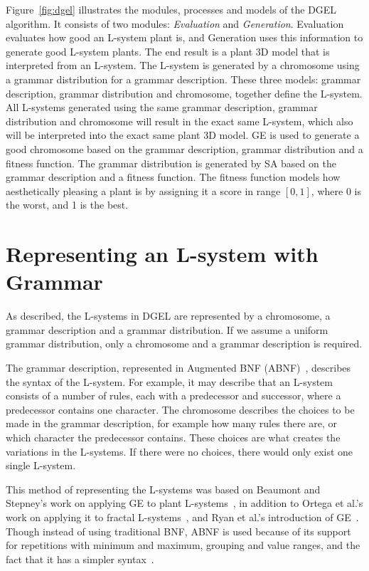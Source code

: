 Figure~\ref{fig:dgel} illustrates the modules, processes and models of the \gls{DGEL} algorithm.
It consists of two modules: \textit{Evaluation} and \textit{Generation}.
Evaluation evaluates how good an \gls{L-system} plant is, and Generation uses this information to generate good \gls{L-system} plants.
The end result is a plant 3D model that is interpreted from an \gls{L-system}.
The \gls{L-system} is generated by a chromosome using a grammar distribution for a grammar description.
These three models: grammar description, grammar distribution and chromosome, together define the \gls{L-system}.
All \glspl{L-system} generated using the same grammar description, grammar distribution and chromosome will result in the exact same \gls{L-system}, which also will be interpreted into the exact same plant 3D model.
\gls{GE} is used to generate a good chromosome based on the grammar description, grammar distribution and a fitness function.
The grammar distribution is generated by \gls{SA} based on the grammar description and a fitness function.
The fitness function models how aesthetically pleasing a plant is by assigning it a score in range $[0, 1]$, where 0 is the worst, and 1 is the best.

\section{Representing an L-system with Grammar}
\label{sec:grammar}
As described, the \glspl{L-system} in \gls{DGEL} are represented by a chromosome, a grammar description and a grammar distribution.
If we assume a uniform grammar distribution, only a chromosome and a grammar description is required.

The grammar description, represented in Augmented BNF (ABNF)~\cite{RFC5234}, describes the syntax of the \gls{L-system}.
For example, it may describe that an \gls{L-system} consists of a number of rules, each with a predecessor and successor, where a predecessor contains one character.
The chromosome describes the choices to be made in the grammar description, for example how many rules there are, or which character the predecessor contains.
These choices are what creates the variations in the \glspl{L-system}.
If there were no choices, there would only exist one single \gls{L-system}.

This method of representing the \glspl{L-system} was based on Beaumont and Stepney's work on applying \gls{GE} to plant \glspl{L-system}~\cite{2009Beaumont}, in addition to Ortega et al.'s work on applying it to fractal \glspl{L-system}~\cite{2003Ortega}, and Ryan et al.'s introduction of \gls{GE}~\cite{1998Ryan}.
Though instead of using traditional BNF, ABNF is used because of its support for repetitions with minimum and maximum, grouping and value ranges, and the fact that it has a simpler syntax~\cite{RFC5234}.

